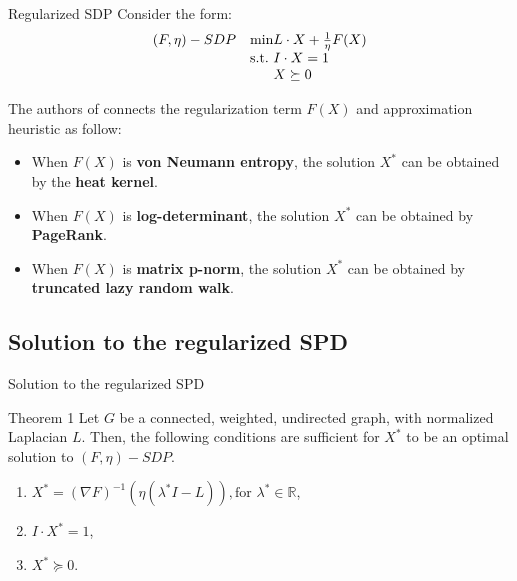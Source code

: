 \documentclass[handout]{beamer}
\begin{document}
    \begin{frame}{Regularized SDP}
        Consider the form:
        \begin{equation*}
            \begin{array}{ll@{}ll}
            (F,\eta) - SDP & \text{min} & L \cdot X + \frac{1}{\eta} F(X) \\
                           & \text{s.t.}& I \cdot X = 1\\
                           &            & X \succeq 0
            \end{array}
        \end{equation*}

        The authors of \cite{mahoney2010implementing} connects the regularization term $F(X)$ and approximation heuristic as follow:
        \pause
        \begin{itemize}
        \item When $F(X)$ is \textbf{von Neumann entropy}, the solution $X^{\ast}$ can be obtained by the \textbf{heat kernel}.
        \pause
        \item When $F(X)$ is \textbf{log-determinant}, the solution $X^{\ast}$ can be obtained by \textbf{PageRank}.
        \pause
        \item When $F(X)$ is \textbf{matrix p-norm}, the solution $X^{\ast}$ can be obtained by \textbf{truncated lazy random walk}.
        \end{itemize}
    \end{frame}

    \subsection{Solution to the regularized SPD}
    
    \begin{frame}{Solution to the regularized SPD}
        \begin{block}{Theorem 1 \cite{mahoney2010implementing}\vspace{0.5em}}
        Let $G$ be a connected, weighted, undirected graph, with normalized Laplacian $L$. Then, the following conditions are sufficient for $X^\ast$ to be an optimal solution to $(F,\eta) - SDP$.
        \begin{enumerate}
            \item $X^\ast = (\nabla F)^{-1}(\eta(\lambda^\ast I - L)), \text{for } \lambda^\ast \in \mathds{R}$,
            \item $I \cdot X^\ast = 1$,
            \item $X^\ast \succeq 0$.
        \end{enumerate}
        \vspace{0.5em}
        \end{block}
    \end{frame}
\end{document}
